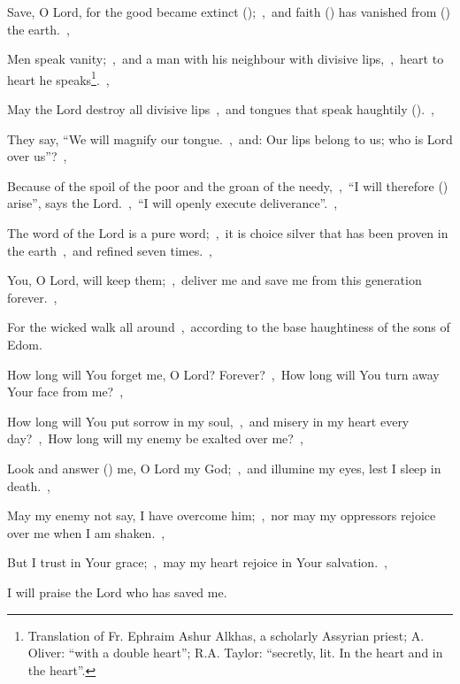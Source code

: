 \documentclass[12pt,twoside,a5paper]{article}
\begin{document}
\begin{normalparskip}
  Save, O Lord, for the good became extinct ();~\sep\ and faith () has vanished from () the earth.~\sep


  Men speak vanity;~\sep\ and a man with his neighbour with divisive lips,~\sep\ heart to heart he speaks\footnote{Translation of Fr. Ephraim Ashur Alkhas, a scholarly Assyrian priest; A. Oliver: ``with a double heart''; R.A. Taylor: ``secretly, lit. In the heart and in the heart''.}.~\sep

  May the Lord destroy all divisive lips~\sep\ and tongues that speak haughtily ().~\sep

  They say, ``We will magnify our tongue.~\sep\ and: Our lips belong to us; who is Lord over us''?~\sep

  Because of the spoil of the poor and the groan of the needy,~\sep\ ``I will therefore () arise'', says the Lord.~\sep\ ``I will openly execute deliverance''.~\sep

  The word of the Lord is a pure word;~\sep\ it is choice silver that has been proven in the earth~\sep\ and refined seven times.~\sep

  You, O Lord, will keep them;~\sep\ deliver me and save me from this generation forever.~\sep

  For the wicked walk all around~\sep\ according to the base haughtiness of the sons of Edom.
\end{normalparskip}


\begin{normalparskip}
  How long will You forget me, O Lord? Forever?~\sep\ How long will You turn away Your face from me?~\sep


  How long will You put sorrow in my soul,~\sep\ and misery in my heart every day?~\sep\ How long will my enemy be exalted over me?~\sep

  Look and answer () me, O Lord my God;~\sep\ and illumine my eyes, lest I sleep in death.~\sep

  May my enemy not say, I have overcome him;~\sep\ nor may my oppressors rejoice over me when I am shaken.~\sep

  But I trust in Your grace;~\sep\ may my heart rejoice in Your salvation.~\sep

  I will praise the Lord who has saved me.
\end{normalparskip}
\end{document}
